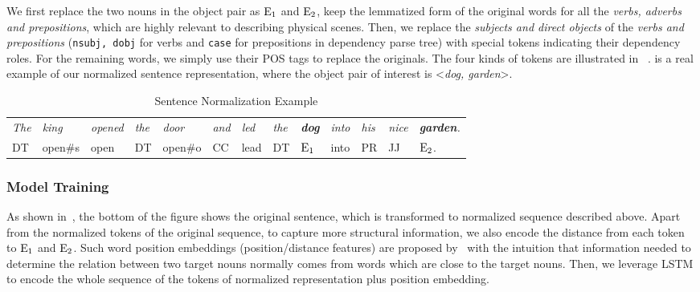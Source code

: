 We first replace the two nouns in the object pair as $\textnormal{E}_1$ and $\textnormal{E}_2$, keep the lemmatized form of the original words for all the \textit{verbs, adverbs and prepositions}, which are highly relevant to describing physical scenes.
Then, we replace the \textit{subjects and direct objects} of the \textit{verbs and prepositions} (\texttt{nsubj, dobj} for verbs and \texttt{case} for prepositions in dependency parse tree) with special tokens indicating their dependency roles. 
For the remaining words, we simply use their POS tags to replace the originals. 
The four kinds of tokens are illustrated in ~.
 is a real example of our normalized sentence representation, where the object pair of interest is \textless \textit{dog, garden}\textgreater. 
\begin{table*}[!th]
	\small
	\centering
	\begin{tabular}{lllllllllllll}
		\hline
		\textit{The }&\textit{king }&\textit{opened }&\textit{the}&\textit{door}&\textit{and}& \textit{led}& \textit{the}& \textit{\textbf{dog} }& \textit{into }& \textit{his }& \textit{nice }& \textit{\textbf{garden}.}\\		 
		DT & open\#s & open & DT & open\#o & CC& lead& DT &$\textnormal{E}_1$ & into & PR & JJ& $\textnormal{E}_2$.\\	 \hline
	\end{tabular}
	\caption{Sentence Normalization Example}
	\label{tab:norm_eg}
\end{table*} 
\subsubsection{Model Training}
As shown in~, the bottom of the figure shows the original sentence, which is transformed to normalized sequence described above.
Apart from the normalized tokens of the original sequence, to capture more structural information, we also encode the distance from each token to $\textnormal E_1$ and $\textnormal E_2$.
{Such {word position embeddings} (position/distance features) are proposed by~\cite{zeng2014relation} with the intuition that information needed to determine the relation between two target nouns normally comes from words which are close to the target nouns.} 
Then, we leverage LSTM to encode the whole sequence of the tokens of normalized representation plus position embedding. 


